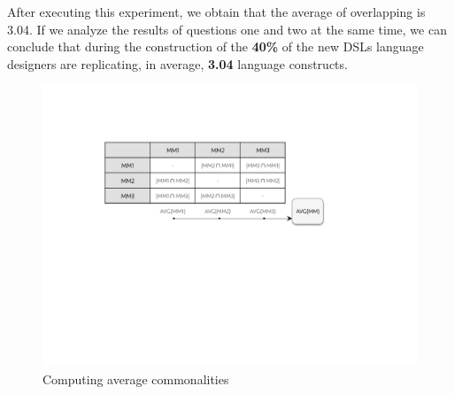 After executing this experiment, we obtain that the average of overlapping is 3.04. If we analyze the results of questions one and two at the same time, we can conclude that during the construction of the \textbf{40\%} of the new DSLs language designers are replicating, in average, \textbf{3.04} language constructs.
\begin{figure}[h!]
\centering
\includegraphics[width=0.75\linewidth]{images/matrix-evaluation.pdf}
\caption{Computing average commonalities}
\label{fig:matrix-evaluation}
\end{figure}





